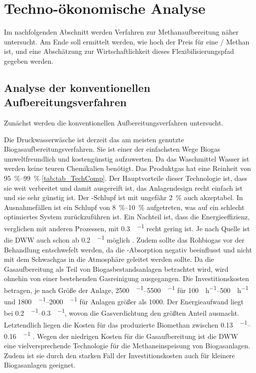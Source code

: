 
\section{Techno-ökonomische Analyse}

Im nachfolgenden Abschnitt werden Verfahren zur Methanaufbereitung näher untersucht. Am Ende soll ermittelt werden, wie hoch der Preis für eine \si{\kwh}/\si{\normvol} Methan ist, und eine Abschätzung zur Wirtschaftlichkeit dieses Flexibilisierungspfad gegeben werden. \newline

\subsection{Analyse der konventionellen Aufbereitungsverfahren}
Zunächst werden die konventionellen Aufbereitungsverfahren untersucht. \smallskip

Die Druckwasserwäsche ist derzeit das am meisten genutzte Biogasaufbereitungsverfahren. Sie ist einer der einfachsten Wege Biogas umweltfreundlich und kostengünstig aufzuwerten. Da das Waschmittel Wasser ist werden keine teuren Chemikalien benötigt. Das Produktgas hat eine  Reinheit von \SIrange{95}{99}{\percent} \ref{tab:tab_TechComp}. Der Hauptvorteile dieser Technologie ist, dass sie weit verbreitet und damit ausgereift ist, das Anlagendesign recht einfach ist und sie sehr günstig ist. Der -Schlupf ist mit ungefähr \SI{2}{\percent} auch akzeptabel. In Ausnahmefällen ist ein Schlupf von \SIrange{8}{10}{\percent} aufgetreten, was auf ein schlecht optimiertes System zurückzuführen ist. Ein Nachteil ist, dass die Energieeffizienz, verglichen mit anderen Prozessen, mit \SI{0,3}{\kwh\per\normvol} recht gering ist. Je nach Quelle ist die \gls{DWW} auch schon ab \SI{0,2}{\kwh\per\normvol} möglich \parencite{Coll17} \parencite{Emp18}. Zudem sollte das Rohbiogas vor der Behandlung entschwefelt werden, da  die -Absorption negativ beeinflusst und nicht mit dem Schwachgas in die Atmosphäre geleitet werden sollte. Da die Gasaufbereitung als Teil von Biogasbestandsanlagen betrachtet wird, wird ohnehin von einer bestehenden Gasreinigung ausgegangen. Die Investitionskosten betragen, je nach Größe der Anlage, \SIrange{2500}{5500}{\sieuro\per\normvolh} für \SIrange{100}{500}{\normvol\per\hour} und \SIrange{1800}{2000}{\sieuro\per\normvolh} für Anlagen größer als \SI{1000}{\normvolh}. Der Energieaufwand liegt bei \SIrange{0,2}{0,3}{\kwh\per\normvol}, wovon die Gasverdichtung den größten Anteil ausmacht. Letztendlich liegen die Kosten für das produzierte Biomethan zwischen \SIrange{0,13}{0,16}{\sieuro\per\normvol} \parencite{Emp18}. Wegen der niedrigen Kosten für die Gasaufbereitung ist die \gls{DWW} eine vielversprechende Technologie für die Methaneinspeisung von Biogasanlagen. Zudem ist sie durch den starken Fall der Investitionskosten auch für kleinere Biogasanlagen geeignet. \parencite{KGKK2019} \parencite{Struk20}\newline

